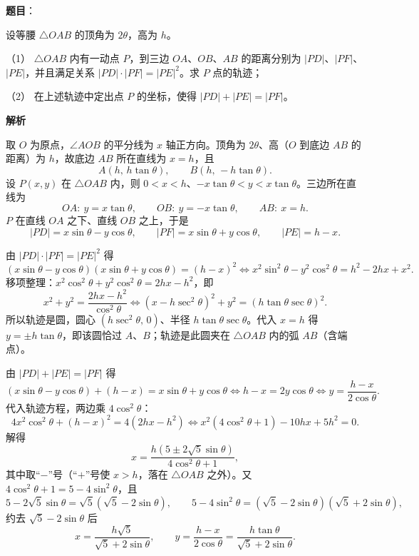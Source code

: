 \begin{answer}

\textbf{题目}：

设等腰 $\triangle OAB$ 的顶角为 $2\theta$，高为 $h$。

（1） $\triangle OAB$ 内有一动点 $P$，到三边 $OA$、$OB$、$AB$ 的距离分别为 $|PD|$、$|PF|$、$|PE|$，并且满足关系 $|PD|\cdot|PF|=|PE|^2$。求 $P$ 点的轨迹；

（2） 在上述轨迹中定出点 $P$ 的坐标，使得 $|PD|+|PE|=|PF|$。

\textbf{解析}

取 $O$ 为原点，$\angle AOB$ 的平分线为 $x$ 轴正方向。顶角为 $2\theta$、高（$O$ 到底边 $AB$ 的距离）为 $h$，故底边 $AB$ 所在直线为 $x=h$，且
\nopagebreak[4]
\[
A(h,\,h\tan\theta),\qquad B(h,\,-h\tan\theta).
\]
设 $P(x,y)$ 在 $\triangle OAB$ 内，则 $0<x<h$、$-x\tan\theta<y<x\tan\theta$。三边所在直线为
\nopagebreak[4]
\[
OA:\ y=x\tan\theta,\qquad OB:\ y=-x\tan\theta,\qquad AB:\ x=h.
\]
$P$ 在直线 $OA$ 之下、直线 $OB$ 之上，于是
\nopagebreak[4]
\[
|PD|=x\sin\theta-y\cos\theta,\qquad |PF|=x\sin\theta+y\cos\theta,\qquad |PE|=h-x.
\]


由 $|PD|\cdot|PF|=|PE|^2$ 得
\nopagebreak[4]
\[
(x\sin\theta-y\cos\theta)(x\sin\theta+y\cos\theta)=(h-x)^2
\iff x^2\sin^2\theta-y^2\cos^2\theta=h^2-2hx+x^2.
\]
移项整理：$x^2\cos^2\theta+y^2\cos^2\theta=2hx-h^2$，即
\nopagebreak[4]
\[
x^2+y^2=\frac{2hx-h^2}{\cos^2\theta}
\iff\left(x-h\sec^2\theta\right)^2+y^2=\left(h\tan\theta\sec\theta\right)^2.
\]
所以轨迹是圆，圆心 $\left(h\sec^2\theta,\,0\right)$、半径 $h\tan\theta\sec\theta$。代入 $x=h$ 得 $y=\pm h\tan\theta$，即该圆恰过 $A$、$B$；轨迹是此圆夹在 $\triangle OAB$ 内的弧 $AB$（含端点）。


由 $|PD|+|PE|=|PF|$ 得
\nopagebreak[4]
\[
(x\sin\theta-y\cos\theta)+(h-x)=x\sin\theta+y\cos\theta
\iff h-x=2y\cos\theta
\iff y=\frac{h-x}{2\cos\theta}.
\]
代入轨迹方程，两边乘 $4\cos^2\theta$：
\nopagebreak[4]
\[
4x^2\cos^2\theta+(h-x)^2=4(2hx-h^2)
\iff x^2\left(4\cos^2\theta+1\right)-10hx+5h^2=0.
\]
解得
\nopagebreak[4]
\[
x=\frac{h\left(5\pm2\sqrt5\sin\theta\right)}{4\cos^2\theta+1},
\]
其中取“$-$”号（“$+$”号使 $x>h$，落在 $\triangle OAB$ 之外）。又 $4\cos^2\theta+1=5-4\sin^2\theta$，且
\nopagebreak[4]
\[
5-2\sqrt5\sin\theta=\sqrt5\left(\sqrt5-2\sin\theta\right),
\qquad
5-4\sin^2\theta=\left(\sqrt5-2\sin\theta\right)\left(\sqrt5+2\sin\theta\right),
\]
约去 $\sqrt5-2\sin\theta$ 后
\nopagebreak[4]
\[
x=\frac{h\sqrt5}{\sqrt5+2\sin\theta},\qquad
y=\frac{h-x}{2\cos\theta}=\frac{h\tan\theta}{\sqrt5+2\sin\theta}.
\]


\end{answer}
